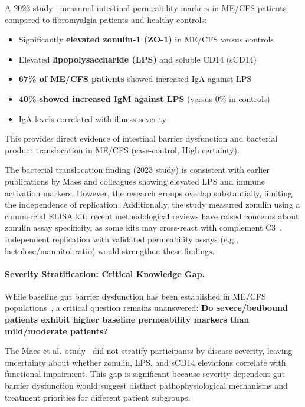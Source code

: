 \begin{achievement}
\label{ach:bacterial-translocation}
A 2023 study~\cite{GutPermeability2023} measured intestinal permeability markers in ME/CFS patients compared to fibromyalgia patients and healthy controls:
\begin{itemize}
    \item Significantly \textbf{elevated zonulin-1 (ZO-1)} in ME/CFS versus controls
    \item Elevated \textbf{lipopolysaccharide (LPS)} and soluble CD14 (sCD14)
    \item \textbf{67\% of ME/CFS patients} showed increased IgA against LPS
    \item \textbf{40\% showed increased IgM against LPS} (versus 0\% in controls)
    \item IgA levels correlated with illness severity
\end{itemize}
This provides direct evidence of intestinal barrier dysfunction and bacterial product translocation in ME/CFS (case-control, High certainty).
\end{achievement}

\begin{warning}
The bacterial translocation finding (2023 study) is consistent with earlier publications by Maes and colleagues showing elevated LPS and immune activation markers. However, the research groups overlap substantially, limiting the independence of replication. Additionally, the study measured zonulin using a commercial ELISA kit; recent methodological reviews have raised concerns about zonulin assay specificity, as some kits may cross-react with complement C3~\cite{GutPermeability2023}. Independent replication with validated permeability assays (e.g., lactulose/mannitol ratio) would strengthen these findings.
\end{warning}

\paragraph{Severity Stratification: Critical Knowledge Gap.}

While baseline gut barrier dysfunction has been established in ME/CFS populations~\cite{GutPermeability2023}, a critical question remains unanswered: \textbf{Do severe/bedbound patients exhibit higher baseline permeability markers than mild/moderate patients?}

The Maes et al.\ study~\cite{GutPermeability2023} did not stratify participants by disease severity, leaving uncertainty about whether zonulin, LPS, and sCD14 elevations correlate with functional impairment. This gap is significant because severity-dependent gut barrier dysfunction would suggest distinct pathophysiological mechanisms and treatment priorities for different patient subgroups.

